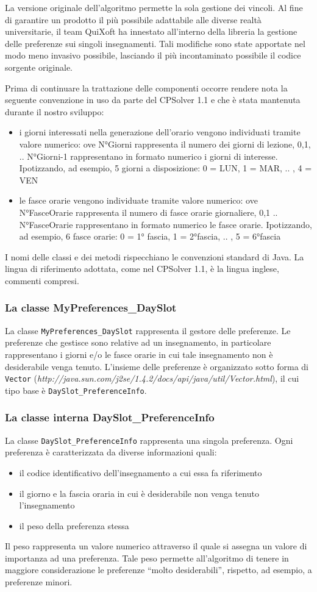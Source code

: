 \documentclass[11pt,a4paper]{article}
\begin{document}
La versione originale dell'algoritmo permette la sola gestione dei vincoli. Al fine di garantire un prodotto il più possibile adattabile alle diverse realtà universitarie, il team QuiXoft ha innestato all'interno della libreria la gestione delle preferenze sui singoli insegnamenti. Tali modifiche sono state apportate nel modo meno invasivo possibile, lasciando il più incontaminato possibile il codice sorgente originale.

Prima di continuare la trattazione delle componenti occorre rendere nota la seguente convenzione in uso da parte del CPSolver 1.1 e che è stata mantenuta durante il nostro sviluppo:
\begin{itemize}
 \item i giorni interessati nella generazione dell'orario vengono individuati tramite valore numerico: ove N°Giorni rappresenta il numero dei giorni di lezione, 0,1, .. N°Giorni-1 rappresentano in formato numerico i giorni di interesse. Ipotizzando, ad esempio, 5 giorni a disposizione: 0 = LUN, 1 = MAR, .. , 4 = VEN
 \item le fasce orarie vengono individuate tramite valore numerico: ove N°FasceOrarie rappresenta il numero di fasce orarie giornaliere, 0,1 .. N°FasceOrarie rappresentano in formato numerico le fasce orarie. Ipotizzando, ad esempio, 6 fasce orarie: 0 = 1° fascia, 1 = 2°fascia, .. , 5 = 6°fascia
\end{itemize}
I nomi delle classi e dei metodi rispecchiano le convenzioni standard di Java. La lingua di riferimento adottata, come nel CPSolver 1.1,  è la lingua inglese, commenti compresi.
\subsubsection*{La classe MyPreferences\_DaySlot}
La classe \verb|MyPreferences_DaySlot| rappresenta il gestore delle preferenze. Le preferenze che gestisce sono relative ad un insegnamento, in particolare rappresentano i giorni e/o le fasce orarie in cui tale insegnamento non è desiderabile venga tenuto.
L'insieme delle preferenze è organizzato sotto forma di \verb|Vector| (\textit{http://java.sun.com/j2se/1.4.2/docs/api/java/util/Vector.html}), il cui tipo base è \verb|DaySlot_PreferenceInfo|.
\subsubsection*{La classe interna DaySlot\_PreferenceInfo}
La classe \verb|DaySlot_PreferenceInfo| rappresenta una singola preferenza. Ogni preferenza è caratterizzata da diverse informazioni quali:
\begin{itemize}
\item	il codice identificativo dell'insegnamento a cui essa fa riferimento
\item	il giorno e la fascia oraria in cui è desiderabile non venga tenuto l'insegnamento
\item	il peso della preferenza stessa
\end{itemize}
Il peso rappresenta un valore numerico attraverso il quale si assegna un valore di importanza ad una preferenza. Tale peso permette all'algoritmo di tenere in maggiore considerazione le preferenze ``molto desiderabili'', rispetto, ad esempio, a preferenze minori.
\end{document}
